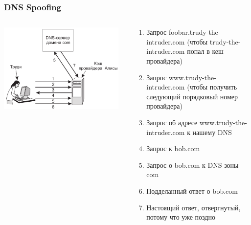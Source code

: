 \documentclass{../cscslides}
\begin{document}
    \begin{frame}
        \frametitle{DNS Spoofing}
        \begin{columns}
            \begin{column}{0.4\textwidth}
                \includegraphics[width=0.95\textwidth]{dnsSpoofing.png}
            \end{column}
            \begin{column}{0.6\textwidth}
                \begin{footnotesize}
                    \begin{enumerate}
                        \item Запрос foobar.trudy-the-intruder.com (чтобы trudy-the-intruder.com попал в кеш провайдера)
                        \item Запрос www.trudy-the-intruder.com (чтобы получить следующий порядковый номер провайдера)
                        \item Запрос об адресе www.trudy-the-intruder.com к нашему DNS
                        \item Запрос к bob.com
                        \item Запрос о bob.com к DNS зоны com
                        \item Подделанный ответ о bob.com
                        \item Настоящий ответ, отвергнутый, потому что уже поздно
                    \end{enumerate}
                \end{footnotesize}
            \end{column}
        \end{columns}
    \end{frame}
\end{document}
